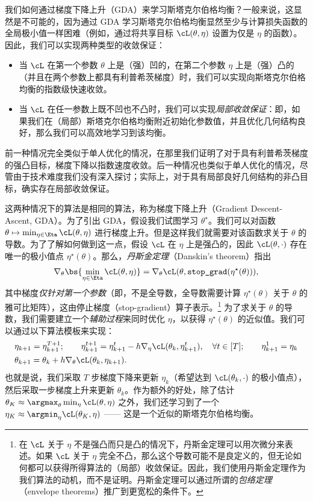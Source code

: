\documentclass[../../book-main_zh.tex]{subfiles}
\begin{document}
我们如何通过梯度下降上升（GDA）来学习斯塔克尔伯格均衡？一般来说，这显然是不可能的，因为通过 GDA 学习斯塔克尔伯格均衡显然至少与计算损失函数的全局极小值一样困难（例如，通过将共享目标 \(\cL(\theta, \eta)\) 设置为仅是 \(\eta\) 的函数）。因此，我们可以实现两种类型的收敛保证：
\begin{itemize}
    \item 当 \(\cL\) 在第一个参数 \(\theta\) 上是（强）凹的，在第二个参数 \(\eta\) 上是（强）凸的（并且在两个参数上都具有利普希茨梯度）时，我们可以实现向斯塔克尔伯格均衡的指数级快速收敛。
    \item 当 \(\cL\) 在任一参数上既不凹也不凸时，我们可以实现\textit{局部收敛保证}：即，如果我们在（局部）斯塔克尔伯格均衡附近初始化参数值，并且优化几何结构良好，那么我们可以高效地学习到该均衡。
\end{itemize}

前一种情况完全类似于单人优化的情况，在那里我们证明了对于具有利普希茨梯度的强凸目标，梯度下降以指数速度收敛。后一种情况也类似于单人优化的情况，尽管由于技术难度我们没有深入探讨；实际上，对于具有局部良好几何结构的非凸目标，确实存在局部收敛保证。

这两种情况下的算法是相同的算法，称为梯度下降上升（Gradient Descent-Ascent, GDA）。为了引出 GDA，假设我们试图学习 \(\theta^{\star}\)。我们可以对函数 \(\theta \mapsto \min_{\eta \in \Eta}\cL(\theta, \eta)\) 进行梯度上升。但是这样我们就需要对该函数求关于 \(\theta\) 的导数。为了了解如何做到这一点，假设 \(\cL\) 在 \(\eta\) 上是强凸的，因此 \(\cL(\theta, \cdot)\) 存在唯一的极小值点 \(\eta^{\star}(\theta)\)。那么，\textit{丹斯金定理}（Danskin's theorem）指出
\begin{equation}
    \nabla_{\theta}\bs{\min_{\eta \in \Eta}\cL(\theta, \eta)} =
    \nabla_{\theta}\cL(\theta, \texttt{stop\_grad}(\eta^{\star}(\theta))),
\end{equation}
其中梯度\textit{仅针对第一个参数}（即，不是全导数，全导数需要计算 \(\eta^{\star}(\theta)\) 关于 \(\theta\) 的雅可比矩阵），这由停止梯度（stop-gradient）算子表示。\footnote{在 \(\cL\) 关于 \(\eta\) 不是强凸而只是凸的情况下，丹斯金定理可以用次微分来表述。如果 \(\cL\) 关于 \(\eta\) 完全不凸，那么这个导数可能不是良定义的，但无论如何都可以获得所得算法的（局部）收敛保证。因此，我们使用丹斯金定理作为我们算法的动机，而不是证明。丹斯金定理可以通过所谓的\textit{包络定理}（envelope theorems）推广到更宽松的条件下。}
为了求关于 \(\theta\) 的导数，我们需要建立一个\textit{辅助过程}来同时优化 \(\eta\)，以获得 \(\eta^{\star}(\theta)\) 的近似值。我们可以通过以下算法模板来实现：
\begin{align}
    &\eta_{k + 1} = \eta_{k + 1}^{T + 1}; \qquad \eta_{k + 1}^{t + 1}
    = \eta_{k + 1}^{t} - h \nabla_{\eta} \cL(\theta_{k}, \eta_{k +
    1}^{t}), \quad \forall t \in [T]; \qquad \eta_{k + 1}^{1} = \eta_{k} \\
    &\theta_{k + 1} = \theta_{k} + h \nabla_{\theta}\cL(\theta_{k},
    \eta_{k + 1}).
\end{align}
也就是说，我们采取 \(T\) 步梯度下降来更新 \(\eta_{k}\)（希望达到 \(\cL(\theta_{k}, \cdot)\) 的极小值点），然后采取一步梯度上升来更新 \(\theta_{k}\)。作为额外的好处，除了估计 \(\theta_{K} \approx
\argmax_{\theta}\min_{\eta}\cL(\theta, \eta)\) 之外，我们还学习到了一个 \(\eta_{K} \approx \argmin_{\eta}\cL(\theta_{K}, \eta)\) —— 这是一个近似的斯塔克尔伯格均衡。
\end{document}
